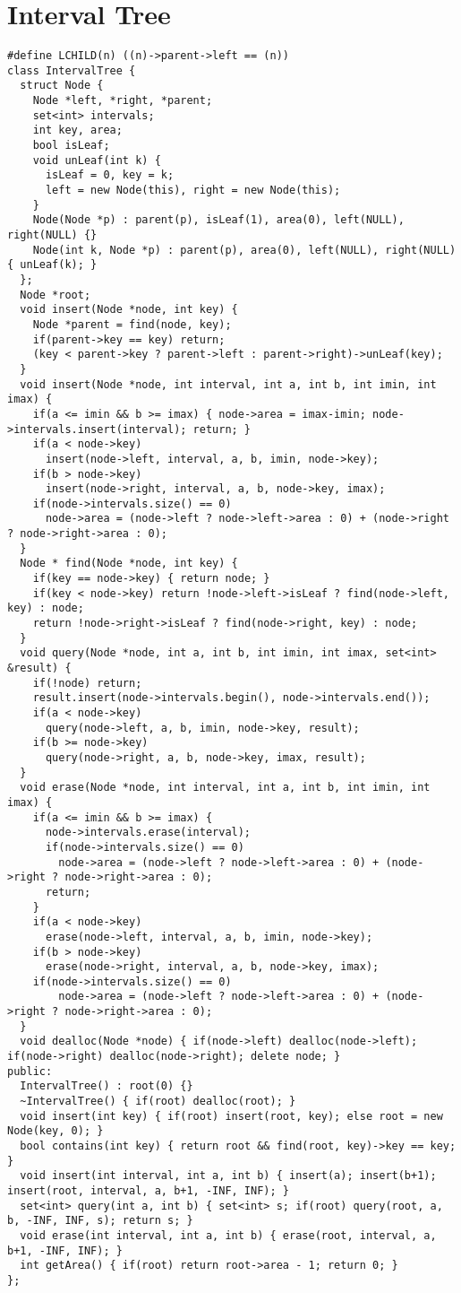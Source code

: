 \documentclass[11pt, oneside]{article}
\begin{document}
\section{Interval Tree}
\begin{lstlisting}
#define LCHILD(n) ((n)->parent->left == (n))
class IntervalTree {
  struct Node {
    Node *left, *right, *parent;
    set<int> intervals;
    int key, area;
    bool isLeaf;
    void unLeaf(int k) {
      isLeaf = 0, key = k;
      left = new Node(this), right = new Node(this);
    }
    Node(Node *p) : parent(p), isLeaf(1), area(0), left(NULL), right(NULL) {}
    Node(int k, Node *p) : parent(p), area(0), left(NULL), right(NULL) { unLeaf(k); }
  };
  Node *root;
  void insert(Node *node, int key) {
    Node *parent = find(node, key);
    if(parent->key == key) return;
    (key < parent->key ? parent->left : parent->right)->unLeaf(key);
  }
  void insert(Node *node, int interval, int a, int b, int imin, int imax) {
    if(a <= imin && b >= imax) { node->area = imax-imin; node->intervals.insert(interval); return; }
    if(a < node->key)
      insert(node->left, interval, a, b, imin, node->key);
    if(b > node->key)
      insert(node->right, interval, a, b, node->key, imax);
    if(node->intervals.size() == 0)
      node->area = (node->left ? node->left->area : 0) + (node->right ? node->right->area : 0);
  }
  Node * find(Node *node, int key) {
    if(key == node->key) { return node; }
    if(key < node->key) return !node->left->isLeaf ? find(node->left, key) : node;
    return !node->right->isLeaf ? find(node->right, key) : node;
  }
  void query(Node *node, int a, int b, int imin, int imax, set<int> &result) {
    if(!node) return;
    result.insert(node->intervals.begin(), node->intervals.end());
    if(a < node->key)
      query(node->left, a, b, imin, node->key, result);
    if(b >= node->key)
      query(node->right, a, b, node->key, imax, result);
  }
  void erase(Node *node, int interval, int a, int b, int imin, int imax) {
    if(a <= imin && b >= imax) {
      node->intervals.erase(interval);
      if(node->intervals.size() == 0)
        node->area = (node->left ? node->left->area : 0) + (node->right ? node->right->area : 0);
      return;
    }
    if(a < node->key)
      erase(node->left, interval, a, b, imin, node->key);
    if(b > node->key)
      erase(node->right, interval, a, b, node->key, imax);
    if(node->intervals.size() == 0)
        node->area = (node->left ? node->left->area : 0) + (node->right ? node->right->area : 0);
  }
  void dealloc(Node *node) { if(node->left) dealloc(node->left); if(node->right) dealloc(node->right); delete node; }
public:
  IntervalTree() : root(0) {}
  ~IntervalTree() { if(root) dealloc(root); }
  void insert(int key) { if(root) insert(root, key); else root = new Node(key, 0); }
  bool contains(int key) { return root && find(root, key)->key == key; }
  void insert(int interval, int a, int b) { insert(a); insert(b+1); insert(root, interval, a, b+1, -INF, INF); }
  set<int> query(int a, int b) { set<int> s; if(root) query(root, a, b, -INF, INF, s); return s; }
  void erase(int interval, int a, int b) { erase(root, interval, a, b+1, -INF, INF); }
  int getArea() { if(root) return root->area - 1; return 0; }
};

\end{lstlisting}
\end{document}
